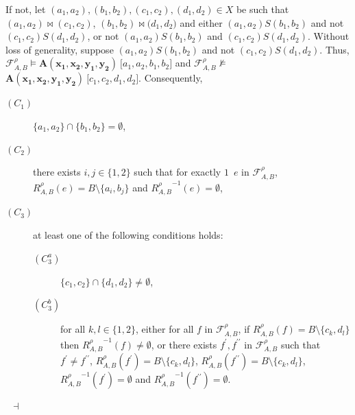 \documentclass[draft]{article}
\newenvironment{proof}{{\bf Proof:}}{~$\dashv$\\}
\begin{document}
\begin{proof}
If not, let $(a_{1},a_{2}),(b_{1},b_{2}),(c_{1},c_{2}),(d_{1},d_{2}){\in}X$ be such that $(a_{1},a_{2}){\bowtie}(c_{1},c_{2})$, $(b_{1},b_{2}){\bowtie}(d_{1},
%
%
%
%
%
%
%
%
%
%
%
%
$\linebreak$
%
%
%
%
%
%
%
%
%
%
%
%
d_{2})$ and either $(a_{1},a_{2}){S}(b_{1},b_{2})$ and not $(c_{1},c_{2}){S}(d_{1},d_{2})$, or not $(a_{1},a_{2}){S}(b_{1},b_{2})$ and $(c_{1},c_{2}){S}(d_{1},d_{2})$.
Without loss of generality, suppose $(a_{1},a_{2}){S}(b_{1},b_{2})$ and not $(c_{1},c_{2}){S}(d_{1},d_{2})$.
Thus, ${\mathcal F}^{\rho}_{A,B}{\models}\mathbf{A}(\mathbf{x_{1}},\mathbf{x_{2}},\mathbf{y_{1}},\mathbf{y_{2}})\ \lbrack a_{1},a_{2},b_{1},b_{2}\rbrack$ and ${\mathcal F}^{\rho}_{A,B}{\not\models}
%
%
%
%
%
%
%
%
%
%
%
%
$\linebreak$
%
%
%
%
%
%
%
%
%
%
%
%
\mathbf{A}(\mathbf{x_{1}},\mathbf{x_{2}},\mathbf{y_{1}},\mathbf{y_{2}})\ \lbrack c_{1},c_{2},d_{1},d_{2}\rbrack$.
Consequently,
%
%
\begin{description}
%
%
\item[$(C_{1})$] $\{a_{1},a_{2}\}{\cap}\{b_{1},b_{2}\}{=}\emptyset$,
%
%
\item[$(C_{2})$] there exists $i,j{\in}\{1,2\}$ such that for exactly $1$~$e$ in ${\mathcal F}_{A,B}^{\rho}$, $R_{A,B}^{\rho}(e){=}B{\setminus}\{a_{i},
%
%
%
%
%
%
%
%
%
%
%
%
$\linebreak$
%
%
%
%
%
%
%
%
%
%
%
%
b_{j}\}$ and ${R_{A,B}^{\rho}}^{{-}1}(e){=}\emptyset$,
%
%
\item[$(C_{3})$] at least one of the following conditions holds:
%
%
\begin{description}
%
%
\item[$(C_{3}^{a})$] $\{c_{1},c_{2}\}{\cap}\{d_{1},d_{2}\}{\not=}\emptyset$,
%
%
\item[$(C_{3}^{b})$] for all $k,l{\in}\{1,2\}$, either for all $f$ in ${\mathcal F}_{A,B}^{\rho}$, if $R_{A,B}^{\rho}(f){=}B{\setminus}\{c_{k},d_{l}\}$ then ${R_{A,B}^{\rho}}^{{-}1}(f){\not=}\emptyset$, or there exists $f^{\prime},f^{\prime\prime}$ in ${\mathcal F}_{A,B}^{\rho}$ such that $f^{\prime}{\not=}f^{\prime\prime}$, $R_{A,B}^{\rho}(f^{\prime}){=}B{\setminus}\{c_{k},d_{l}\}$, $R_{A,B}^{\rho}(f^{\prime\prime}){=}B{\setminus}\{c_{k},d_{l}\}$, ${R_{A,B}^{\rho}}^{{-}1}(f^{\prime}){=}\emptyset$ and
%
%
%
%
%
%
%
%
%
%
%
%
\linebreak$
%
%
%
%
%
%
%
%
%
%
%
%
{R_{A,B}^{\rho}}^{{-}1}(f^{\prime\prime}){=}\emptyset$.
%
%
\end{description}
%
%
\end{description}

\end{proof}
\end{document}

